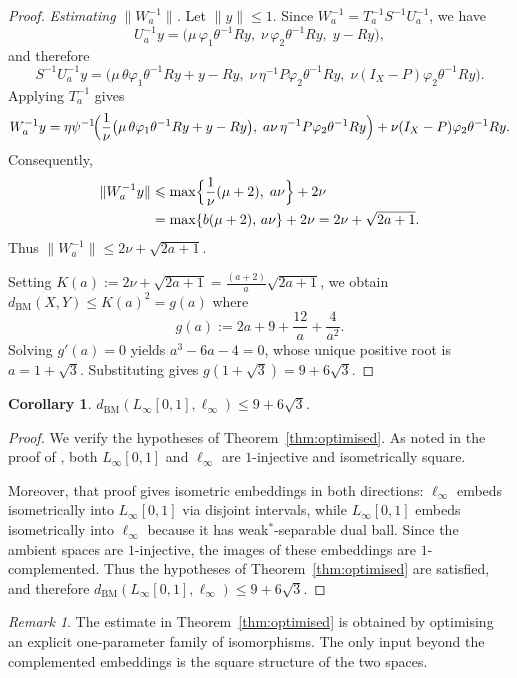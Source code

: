 \documentclass[11pt]{amsart}
\renewcommand{\le}{\leqslant}
\newtheorem{corollary}[theorem]{Corollary}
\theoremstyle{definition}
\theoremstyle{remark}
\newtheorem{remark}[theorem]{Remark}
\theoremstyle{plain}
\numberwithin{equation}{section}
\newcommand{\BM}{\mathrm{BM}}
\newcommand{\dist}{d_{\BM}}
\begin{document}
\begin{proof}
\smallskip
\noindent\emph{Estimating $\|W_a^{-1}\|$.}
Let $\|y\|\le 1$.  Since $W_a^{-1}=T_a^{-1}S^{-1}U_a^{-1}$, we have
\[
U_a^{-1}y
=
\bigl(
\mu\,\varphi_1\theta^{-1}Ry,\;
\nu\,\varphi_2\theta^{-1}Ry,\;
y-Ry
\bigr),
\]
and therefore
\[
S^{-1}U_a^{-1}y
=
\bigl(
\mu\,\theta\varphi_1\theta^{-1}Ry+y-Ry,\;
\nu\,\eta^{-1}P\varphi_2\theta^{-1}Ry,\;
\nu(I_X-P)\varphi_2\theta^{-1}Ry
\bigr).
\]
Applying $T_a^{-1}$ gives
\[
W_a^{-1}y
=
\eta\psi^{-1}\!\Bigl(
\frac{1}{\nu}\bigl(\mu\,\theta\varphi_1\theta^{-1}Ry+y-Ry\bigr),\;
a\nu\,\eta^{-1}P\varphi_2\theta^{-1}Ry
\Bigr)
+
\nu(I_X-P)\varphi_2\theta^{-1}Ry.
\]
Consequently,
\begin{align*}
\|W_a^{-1}y\|
&\le
\max\Bigl\{
\frac{1}{\nu}(\mu+2),\;
a\nu
\Bigr\}
+2\nu \\
&=
\max\{b(\mu+2),\,a\nu\}+2\nu
=
2\nu+\sqrt{2a+1}.
\end{align*}
Thus $\|W_a^{-1}\|\le 2\nu+\sqrt{2a+1}$.

\smallskip
Setting $K(a):=2\nu+\sqrt{2a+1}=\frac{(a+2)}{a}\sqrt{2a+1}$,
we obtain $\dist(X,Y)\le K(a)^2=g(a)$ where
\[
g(a):=2a+9+\frac{12}{a}+\frac{4}{a^2}.
\]
Solving $g'(a)=0$ yields $a^3-6a-4=0$, whose unique positive root is
$a=1+\sqrt{3}$.  Substituting gives $g(1+\sqrt{3})=9+6\sqrt{3}$.
\end{proof}

\begin{corollary}\label{cor:linfty-ellinfty}
$\dist(L_\infty[0,1],\ell_\infty)\le 9+6\sqrt{3}$.
\end{corollary}

\begin{proof}
We verify the hypotheses of Theorem~\ref{thm:optimised}.
As noted in the proof of \cite[Corollary~5.2]{KorpalskiPlebanek},
both $L_\infty[0,1]$ and $\ell_\infty$ are $1$-injective and
isometrically square.

Moreover, that proof gives isometric embeddings in both directions:
$\ell_\infty$ embeds isometrically into $L_\infty[0,1]$ via disjoint
intervals, while $L_\infty[0,1]$ embeds isometrically into
$\ell_\infty$ because it has weak$^*$-separable dual ball.
Since the ambient spaces are $1$-injective, the images of these
embeddings are $1$-complemented. Thus the hypotheses of Theorem~\ref{thm:optimised} are satisfied, and
therefore
\(
\dist(L_\infty[0,1],\ell_\infty)\le 9+6\sqrt{3}.
\)
\end{proof}

\begin{remark}
The estimate in Theorem~\ref{thm:optimised} is obtained by optimising
an explicit one-parameter family of isomorphisms.  The only input
beyond the complemented embeddings is the square structure of the two
spaces.
\end{remark}
\end{document}
